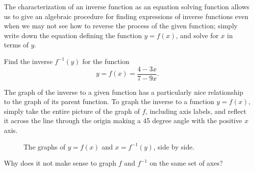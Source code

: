 The characterization of an inverse function as an equation solving function allows us to give an algebraic procedure for finding expressions of inverse functions even when we may not see how to reverse the process of the given function; simply write down the equation defining the function $y=f(x)$, and solve for $x$ in terms of $y$.

\par

\begin{question} Find the inverse $f^{-1}(y)$ for the function
\[
y = f(x) = \frac{4-3x}{7-9x}.
\]
\end{question}

The graph of the inverse to a given function has a particularly nice relationship to the graph of its parent function. To graph the inverse to a function $y=f(x)$, simply take the entire picture of the graph of $f$, including axis labels, and reflect it across the line through the origin making a 45 degree angle with the positive $x$ axis.

\begin{figure}[h]
\begin{minipage}[b]{0.5\textwidth}

\end{minipage}
\hfill
\begin{minipage}[b]{0.5\textwidth}
\end{minipage}
\caption{The graphs of $y=f(x)$ and $x = f^{-1}(y)$, side by side.}
\end{figure} 
   
\begin{question} Why does it not make sense to graph $f$ and $f^{-1}$ on the same set of axes?   
\end{question} 
   
  

